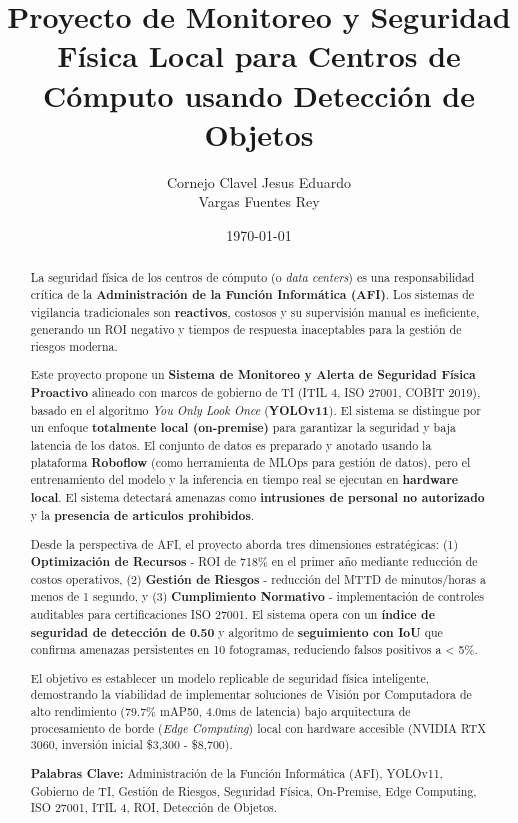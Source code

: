 \documentclass[12pt, a4paper]{article}
\title{
\vspace{1cm}
\textbf{Proyecto de Monitoreo y Seguridad Física Local para Centros de Cómputo usando Detección de Objetos} \\
\vspace{0.5cm}
}
\author{
Cornejo Clavel Jesus Eduardo \\
Vargas Fuentes Rey
}
\date{\today}
\begin{document}
\maketitle
\thispagestyle{empty}

\newpage

\begin{abstract}
\noindent
La seguridad física de los centros de cómputo (o \textit{data centers}) es una responsabilidad crítica de la \textbf{Administración de la Función Informática (AFI)}. Los sistemas de vigilancia tradicionales son \textbf{reactivos}, costosos y su supervisión manual es ineficiente, generando un ROI negativo y tiempos de respuesta inaceptables para la gestión de riesgos moderna.

\noindent
Este proyecto propone un \textbf{Sistema de Monitoreo y Alerta de Seguridad Física Proactivo} alineado con marcos de gobierno de TI (ITIL 4, ISO 27001, COBIT 2019), basado en el algoritmo \textit{You Only Look Once} (\textbf{YOLOv11}). El sistema se distingue por un enfoque \textbf{totalmente local (on-premise)} para garantizar la seguridad y baja latencia de los datos. El conjunto de datos es preparado y anotado usando la plataforma \textbf{Roboflow} (como herramienta de MLOps para gestión de datos), pero el entrenamiento del modelo y la inferencia en tiempo real se ejecutan en \textbf{hardware local}. El sistema detectará amenazas como \textbf{intrusiones de personal no autorizado} y la \textbf{presencia de articulos prohibidos}.

\noindent
Desde la perspectiva de AFI, el proyecto aborda tres dimensiones estratégicas: (1) \textbf{Optimización de Recursos} - ROI de 718\% en el primer año mediante reducción de costos operativos, (2) \textbf{Gestión de Riesgos} - reducción del MTTD de minutos/horas a menos de 1 segundo, y (3) \textbf{Cumplimiento Normativo} - implementación de controles auditables para certificaciones ISO 27001. El sistema opera con un \textbf{índice de seguridad de detección de 0.50} y algoritmo de \textbf{seguimiento con IoU} que confirma amenazas persistentes en 10 fotogramas, reduciendo falsos positivos a < 5\%.

\noindent
El objetivo es establecer un modelo replicable de seguridad física inteligente, demostrando la viabilidad de implementar soluciones de Visión por Computadora de alto rendimiento (79.7\% mAP50, 4.0ms de latencia) bajo arquitectura de procesamiento de borde (\textit{Edge Computing}) local con hardware accesible (NVIDIA RTX 3060, inversión inicial \$3,300 - \$8,700).

\vspace{1cm}

\noindent
\textbf{Palabras Clave:} Administración de la Función Informática (AFI), YOLOv11, Gobierno de TI, Gestión de Riesgos, Seguridad Física, On-Premise, Edge Computing, ISO 27001, ITIL 4, ROI, Detección de Objetos.
\end{abstract}
\end{document}
